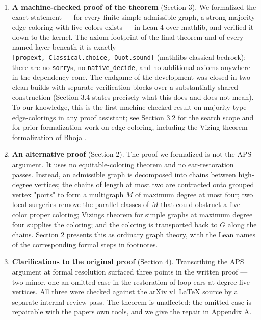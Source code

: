 \documentclass[11pt]{article}
\theoremstyle{definition}
\theoremstyle{remark}
\begin{document}
\begin{enumerate}
\def\labelenumi{\arabic{enumi}.}
\item
  \textbf{A machine-checked proof of the theorem} (Section 3). We formalized the exact statement --- for every finite simple admissible graph, a strong majority edge-coloring with five colors exists --- in Lean 4 over mathlib, and verified it down to the kernel. The axiom footprint of the final theorem and of every named layer beneath it is exactly \texttt{{[}propext,\ Classical.choice,\ Quot.sound{]}} (mathlib\textquotesingle s classical bedrock); there are no \texttt{sorry}s, no \texttt{native\_decide}, and no additional axioms anywhere in the dependency cone. The endgame of the development was closed in two clean builds with separate verification blocks over a substantially shared construction (Section 3.4 states precisely what this does and does not mean). To our knowledge, this is the first machine-checked result on majority-type edge-colorings in any proof assistant; see Section 3.2 for the search scope and for prior formalization work on edge coloring, including the Vizing-theorem formalization of Bhoja \cite{Bho}.
\item
  \textbf{An alternative proof} (Section 2). The proof we formalized is not the APS argument. It uses no equitable-coloring theorem and no ear-restoration passes. Instead, an admissible graph is decomposed into chains between high-degree vertices; the chains of length at most two are contracted onto grouped vertex "ports" to form a multigraph \(M\) of maximum degree at most four; two local surgeries remove the parallel classes of \(M\) that could obstruct a five-color proper coloring; Vizing\textquotesingle s theorem for simple graphs at maximum degree four supplies the coloring; and the coloring is transported back to \(G\) along the chains. Section 2 presents this as ordinary graph theory, with the Lean names of the corresponding formal steps in footnotes.
\item
  \textbf{Clarifications to the original proof} (Section 4). Transcribing the APS argument at formal resolution surfaced three points in the written proof --- two minor, one an omitted case in the restoration of loop ears at degree-five vertices. All three were checked against the arXiv v1 LaTeX source by a separate internal review pass. The theorem is unaffected: the omitted case is repairable with the paper\textquotesingle s own tools, and we give the repair in Appendix A.
\end{enumerate}
\end{document}
